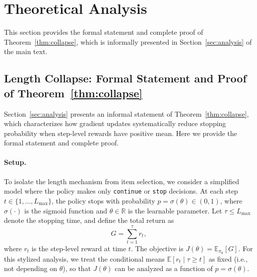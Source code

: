 \section{Theoretical Analysis}
\label{app:theory}

This section provides the formal statement and complete proof of Theorem~\ref{thm:collapse}, which is informally presented in Section~\ref{sec:analysis} of the main text.

\subsection{Length Collapse: Formal Statement and Proof of Theorem~\ref{thm:collapse}}
\label{app:length_collapse}

Section~\ref{sec:analysis} presents an informal statement of Theorem~\ref{thm:collapse}, which characterizes how gradient updates systematically reduce stopping probability when step-level rewards have positive mean. Here we provide the formal statement and complete proof.

\paragraph{Setup.} To isolate the length mechanism from item selection, we consider a simplified model where the policy makes only \texttt{continue} or \texttt{stop} decisions. At each step $t \in \{1, \ldots, L_{\max}\}$, the policy stops with probability $p = \sigma(\theta) \in (0,1)$, where $\sigma(\cdot)$ is the sigmoid function and $\theta \in \mathbb{R}$ is the learnable parameter. Let $\tau \leq L_{\max}$ denote the stopping time, and define the total return as
\begin{equation}
    G = \sum_{t=1}^{\tau} r_t,
\end{equation}
where $r_t$ is the step-level reward at time $t$. The objective is $J(\theta) = \mathbb{E}_{\pi_\theta}[G]$. For this stylized analysis, we treat the conditional means $\mathbb{E}[r_t \mid \tau \ge t]$ as fixed (i.e., not depending on $\theta$), so that $J(\theta)$ can be analyzed as a function of $p=\sigma(\theta)$.

